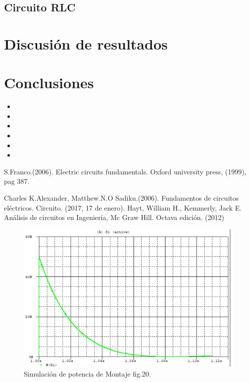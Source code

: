 \documentclass[twocolumn,11pts]{IEEEtran}
\renewcommand{\refname}{Referencias}
\begin{document}
\subsection{Circuito RLC}
 
\section{Discusión de resultados}

\section{Conclusiones}
\begin{itemize}

\item 
\item 
\item 
\item 
\item 
\item 
\end{itemize}



\renewcommand{\refname}{Referencias}

\begin{thebibliography}{5}
 S.Franco.(2006). Electric circuits fundamentals.
Oxford university press, (1999), pag 387.

 Charles K.Alexander, Matthew.N.O Sadiku.(2006). Fundamentos de circuitos eléctricos.
Circuito. (2017, 17 de enero).
 Hayt, William H., Kemmerly, Jack E. Análisis de circuitos en Ingeniería, Mc Graw Hill. Octava edición. (2012)
\end{thebibliography}




\begin{center}
 \begin{figure}[H]
 \centering
 \includegraphics[scale=0.6]{Potencia1.png}
\caption{Simulación de potencia de Montaje fig.20.}
 \end{figure}
\end{center}
\end{document}
